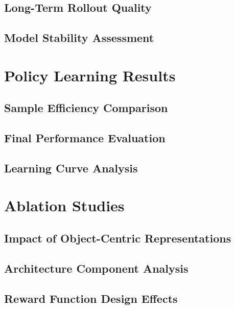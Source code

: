 \documentclass[
	english,
	ruledheaders=section,
	class=report,
	thesis={type=master},
	accentcolor=9c,
	custommargins=true,
	marginpar=false,
	parskip=half-,
	fontsize=11pt,
]{tudapub}
\begin{document}
\subsection{Long-Term Rollout Quality}
\label{subsec:rollout_quality}

\subsection{Model Stability Assessment}
\label{subsec:stability}

\section{Policy Learning Results}
\label{sec:policy_results}

\subsection{Sample Efficiency Comparison}
\label{subsec:sample_efficiency_comp}

\subsection{Final Performance Evaluation}
\label{subsec:final_performance}

\subsection{Learning Curve Analysis}
\label{subsec:learning_curves}

\section{Ablation Studies}
\label{sec:ablation_studies}

\subsection{Impact of Object-Centric Representations}
\label{subsec:oc_impact}

\subsection{Architecture Component Analysis}
\label{subsec:architecture_analysis}

\subsection{Reward Function Design Effects}
\label{subsec:reward_effects}
\end{document}
